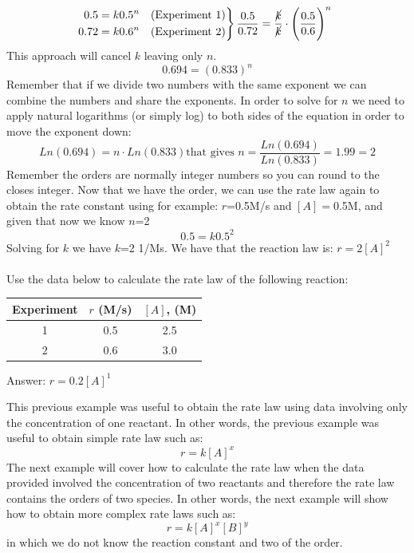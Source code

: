 \documentclass[main.tex]{subfiles}
\begin{document}
\begin{description}
\begin{example}
\begin{align*}
&\
   \left.\begin{aligned}
    0.5=k0.5^n\quad (\text{Experiment 1}) \\
    0.72=k0.6^n\quad (\text{Experiment 2}) 
\end{aligned}
\right\}         \frac{0.5}{0.72}=\frac{\cancel{k}}{\cancel{k}}\cdot \Bigg(\frac{0.5}{0.6}\Bigg)^n 
\end{align*}
This approach will cancel $k$ leaving only $n$. 
\[ 0.694=(0.833)^n\]
Remember that if we divide two numbers with the same exponent we can combine the numbers and share the exponents. In order to solve for $n$ we need to apply 	natural logarithms (or simply log) to both sides of the equation in order to move the exponent down:
\[Ln(0.694)=n\cdot Ln(0.833) \text{that gives }n=\frac{Ln(0.694)}{Ln(0.833)}=1.99=2\]
Remember the orders are normally integer numbers so you can round to the closes integer. Now that we have the order, we can use the rate law again to obtain the rate constant using for example: $r$=0.5M/s and $[A]=$0.5M, and given that now we know $n$=2
\[ 0.5=k0.5^2\]
Solving for $k$ we have $k$=2 1/Ms. We have that the reaction law is: $r=2[A]^2$
\\
\faDiamond\ \\
Use the data below to calculate the rate law of the following reaction: 
\begin{center}\begin{tabular}[t]{  c c  c   }
\toprule
 Experiment &$r$ (M/s)	&$[A]$, (M) \\
\midrule
1&	0.5&	2.5\\
2&	0.6 &3.0	\\
\bottomrule
\end{tabular}\end{center}
\flushright Answer:   $r=0.2[A]^1$
\end{example}%
This previous example was useful to obtain the rate law using data involving only the concentration of one reactant. In other words, the previous example was useful to obtain simple rate law such as:
\[r=k[A]^x\]
The next example will cover how to calculate the rate law when the data provided involved the concentration of two reactants and therefore the rate law contains the orders of two species. In other words, the next example will show how to obtain more complex rate laws such as:
\[r=k[A]^x[B]^y\]
in which we do not know the reaction constant and two of the order.

\end{description}
\end{document}

